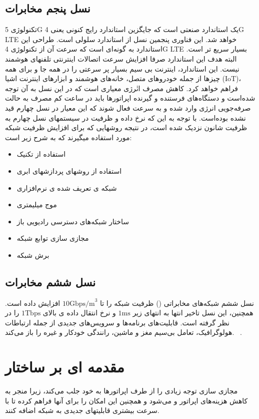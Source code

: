  \subsection{نسل پنجم مخابرات}
تکنولوژی 5G یک استاندارد صنعتی است که جایگزین استاندارد رایج کنونی یعنی 4G LTE خواهد شد. این فناوری پنجمین نسل از استاندارد سلولی است. طراحی این استاندارد به گونه‌ای است که سرعت آن از تکنولوژی 4G LTE بسیار سریع تر است. البته هدف این استاندارد صرفا افزایش سرعت اتصالات اینترنتی تلفنهای هوشمند نیست. این استاندارد، اینترنت بی سیم بسیار پر سرعتی را در همه جا و برای همه چیزها از جمله خودروهای متصل، خانه‌های هوشمند و ابزارهای اینترنت اشیا (IoT)، فراهم خواهد کرد. 
کاهش مصرف انٰرژی  معیاری است که در این نسل به آن توجه شده‌است و دستگاه‌های فرستنده و گیرنده اپراتورها باید در ساعت کم مصرف به حالت صرفه‌جویی انرژی وارد شده و به سرعت فعال شوند که این معیار در نسل چهارم قید نشده بوده‌است.
 با توجه
به این که نرخ داده و ظرفیت در سیستمهای نسل چهارم به ظرفیت
شانون نزدیک شده است، در نتیجه روشهایی که برای
افزایش ظرفیت شبکه مورد استفاده میگیرند که به شرح زیر است:
\begin{itemize}
\item
استفاده از تکنیک 
\item
استفاده از روشهای پردازشهای ابری
\item
شبکه ی تعریف شده ی نرم‌افزاری
\item
موج میلیمتری
\item 
ساختار شبکه‌های دسترسی رادیویی باز
\item 
مجازی سازی توابع شبکه
\item 
برش شبکه
\end{itemize}
\subsection{نسل ششم مخابرات}
نسل ششم شبکه‌های مخابراتی 
()
ظرفیت شبکه را تا 
$10\text{Gbps/m}^{3}$
افزایش داده است. همچنین، این نسل تاخیر انتها به انتهای زیر 
$1\text{ms}$
و نرخ انتقال داده ی بالای 
$1 \text{Tbps}$ 
را در نظر گرفته است.
قابلیت‌های  برنامه‌ها و سرویس‌های جدیدی از جمله ارتباطات هولوگرافیک، تعامل بی‌سیم مغز و ماشین، رانندگی خودکار و غیره را باز می‌کند.
~\cite{slawomir20216g}.
\section{مقدمه ای بر ساختار }
مجازی سازی  توجه زیادی را از طرف اپراتورها به خود جلب می‌کند، زیرا منجر به کاهش هزینه‌های اپراتور و  می‌شود و همچنین این امکان را برای آنها فراهم کرده تا با سرعت بیشتری قابلیتهای جدیدی به شبکه اضافه کنند.

